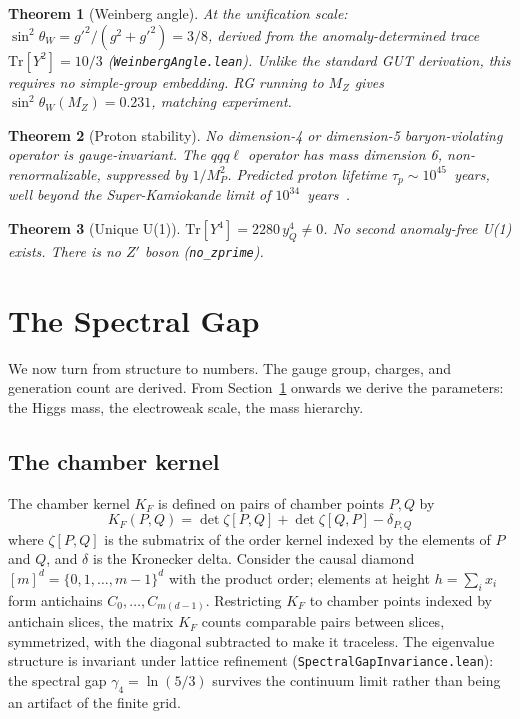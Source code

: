 \documentclass[11pt,letterpaper]{article}
\newtheorem{theorem}{Theorem}
\theoremstyle{remark}
\newcommand{\lean}[1]{\texttt{\small #1}}
\begin{document}
\begin{theorem}[Weinberg angle]
At the unification scale:
$\sin^2\theta_W = g'^2/(g^2 + g'^2) = 3/8$, derived from the
anomaly-determined trace $\mathrm{Tr}[Y^2] = 10/3$
(\lean{WeinbergAngle.lean}). Unlike the standard GUT derivation,
this requires no simple-group embedding. RG running to $M_Z$ gives
$\sin^2\theta_W(M_Z) = 0.231$, matching experiment.
\end{theorem}

\begin{theorem}[Proton stability]
No dimension-4 or dimension-5 baryon-violating operator is
gauge-invariant. The $qqq\ell$ operator has mass dimension 6,
non-renormalizable, suppressed by $1/M_P^2$. Predicted proton
lifetime $\tau_p \sim 10^{45}$~years, well beyond the
Super-Kamiokande limit of $10^{34}$~years~\cite{SuperK}.
\end{theorem}

\begin{theorem}[Unique U(1)]
$\mathrm{Tr}[Y^4] = 2280\,y_Q^4 \neq 0$. No second anomaly-free U(1)
exists. There is no $Z'$ boson (\lean{no\_zprime}).
\end{theorem}

\section{The Spectral Gap}
\label{sec:spectral}

We now turn from structure to numbers. The gauge group,
charges, and generation count are derived. From Section~\ref{sec:spectral}
onwards we derive the parameters: the Higgs mass, the electroweak
scale, the mass hierarchy.

\subsection{The chamber kernel}

The chamber kernel $K_F$ is defined on pairs of chamber points $P, Q$
by
\[
  K_F(P, Q) = \det\zeta[P, Q] + \det\zeta[Q, P] - \delta_{P, Q}
\]
where $\zeta[P, Q]$ is the submatrix of the order kernel indexed by
the elements of $P$ and $Q$, and $\delta$ is the Kronecker delta.
Consider the causal diamond $[m]^d = \{0, 1, \ldots, m-1\}^d$ with
the product order; elements at height $h = \sum_i x_i$ form antichains
$C_0, \ldots, C_{m(d-1)}$. Restricting $K_F$ to chamber points
indexed by antichain slices, the matrix $K_F$ counts comparable
pairs between slices, symmetrized, with the diagonal subtracted to
make it traceless. The eigenvalue structure is invariant under lattice
refinement (\lean{SpectralGapInvariance.lean}): the spectral gap
$\gamma_4 = \ln(5/3)$ survives the continuum limit rather than being
an artifact of the finite grid.
\end{document}
